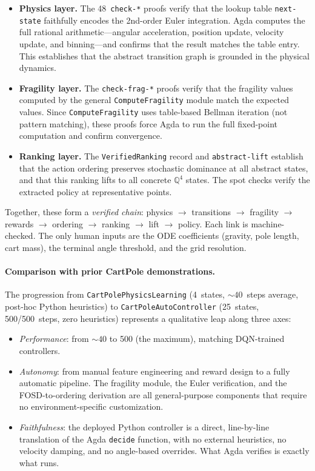 \documentclass[9pt,a4paper]{article}
\theoremstyle{plain}
\theoremstyle{definition}
\theoremstyle{remark}
\begin{document}
\begin{itemize}
\item \textbf{Physics layer.}  The 48~\texttt{check-*} proofs verify that the lookup table \texttt{next-state} faithfully encodes the 2nd-order Euler integration.  Agda computes the full rational arithmetic---angular acceleration, position update, velocity update, and binning---and confirms that the result matches the table entry.  This establishes that the abstract transition graph is grounded in the physical dynamics.

\item \textbf{Fragility layer.}  The \texttt{check-frag-*} proofs verify that the fragility values computed by the general \texttt{ComputeFragility} module match the expected values.  Since \texttt{ComputeFragility} uses table-based Bellman iteration (not pattern matching), these proofs force Agda to run the full fixed-point computation and confirm convergence.

\item \textbf{Ranking layer.}  The \texttt{VerifiedRanking} record and \texttt{abstract-lift} establish that the action ordering preserves stochastic dominance at all abstract states, and that this ranking lifts to all concrete $\mathbb{Q}^4$ states.  The spot checks verify the extracted policy at representative points.
\end{itemize}

Together, these form a \emph{verified chain}: physics $\to$ transitions $\to$ fragility $\to$ rewards $\to$ ordering $\to$ ranking $\to$ lift $\to$ policy.  Each link is machine-checked.  The only human inputs are the ODE coefficients (gravity, pole length, cart mass), the terminal angle threshold, and the grid resolution.

\paragraph{Comparison with prior CartPole demonstrations.}
The progression from \texttt{CartPolePhysicsLearning} (4~states, ${\sim}40$~steps average, post-hoc Python heuristics) to \texttt{CartPoleAutoController} (25~states, 500/500~steps, zero heuristics) represents a qualitative leap along three axes:

\begin{itemize}
\item \emph{Performance}: from ${\sim}40$ to 500 (the maximum), matching DQN-trained controllers.
\item \emph{Autonomy}: from manual feature engineering and reward design to a fully automatic pipeline.  The fragility module, the Euler verification, and the FOSD-to-ordering derivation are all general-purpose components that require no environment-specific customization.
\item \emph{Faithfulness}: the deployed Python controller is a direct, line-by-line translation of the Agda \texttt{decide} function, with no external heuristics, no velocity damping, and no angle-based overrides.  What Agda verifies is exactly what runs.
\end{itemize}
\end{document}
